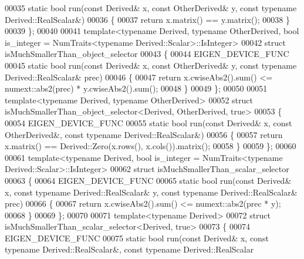 \begin{DoxyCode}
00035   \textcolor{keyword}{static} \textcolor{keywordtype}{bool} run(\textcolor{keyword}{const} Derived& x, \textcolor{keyword}{const} OtherDerived& y, \textcolor{keyword}{const} \textcolor{keyword}{typename} Derived::RealScalar&)
00036   \{
00037     \textcolor{keywordflow}{return} x.matrix() == y.matrix();
00038   \}
00039 \};
00040 
00041 template<typename Derived, typename OtherDerived, bool is\_integer = NumTraits<typename
       Derived::Scalar>::IsInteger>
00042 \textcolor{keyword}{struct }isMuchSmallerThan\_object\_selector
00043 \{
00044   EIGEN\_DEVICE\_FUNC
00045   \textcolor{keyword}{static} \textcolor{keywordtype}{bool} run(\textcolor{keyword}{const} Derived& x, \textcolor{keyword}{const} OtherDerived& y, \textcolor{keyword}{const} \textcolor{keyword}{typename} Derived::RealScalar& prec)
00046   \{
00047     \textcolor{keywordflow}{return} x.cwiseAbs2().sum() <= numext::abs2(prec) * y.cwiseAbs2().sum();
00048   \}
00049 \};
00050 
00051 \textcolor{keyword}{template}<\textcolor{keyword}{typename} Derived, \textcolor{keyword}{typename} OtherDerived>
00052 \textcolor{keyword}{struct }isMuchSmallerThan\_object\_selector<Derived, OtherDerived, true>
00053 \{
00054   EIGEN\_DEVICE\_FUNC
00055   \textcolor{keyword}{static} \textcolor{keywordtype}{bool} run(\textcolor{keyword}{const} Derived& x, \textcolor{keyword}{const} OtherDerived&, \textcolor{keyword}{const} \textcolor{keyword}{typename} Derived::RealScalar&)
00056   \{
00057     \textcolor{keywordflow}{return} x.matrix() == Derived::Zero(x.rows(), x.cols()).matrix();
00058   \}
00059 \};
00060 
00061 template<typename Derived, bool is\_integer = NumTraits<typename Derived::Scalar>::IsInteger>
00062 \textcolor{keyword}{struct }isMuchSmallerThan\_scalar\_selector
00063 \{
00064   EIGEN\_DEVICE\_FUNC
00065   \textcolor{keyword}{static} \textcolor{keywordtype}{bool} run(\textcolor{keyword}{const} Derived& x, \textcolor{keyword}{const} \textcolor{keyword}{typename} Derived::RealScalar& y, \textcolor{keyword}{const} \textcolor{keyword}{typename} 
      Derived::RealScalar& prec)
00066   \{
00067     \textcolor{keywordflow}{return} x.cwiseAbs2().sum() <= numext::abs2(prec * y);
00068   \}
00069 \};
00070 
00071 \textcolor{keyword}{template}<\textcolor{keyword}{typename} Derived>
00072 \textcolor{keyword}{struct }isMuchSmallerThan\_scalar\_selector<Derived, true>
00073 \{
00074   EIGEN\_DEVICE\_FUNC
00075   \textcolor{keyword}{static} \textcolor{keywordtype}{bool} run(\textcolor{keyword}{const} Derived& x, \textcolor{keyword}{const} \textcolor{keyword}{typename} Derived::RealScalar&, \textcolor{keyword}{const} \textcolor{keyword}{typename} Derived::RealScalar

\end{DoxyCode}
